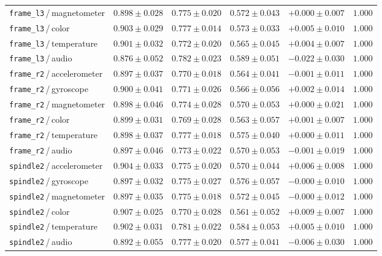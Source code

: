 \begin{table}[!htbp]
\begin{tabular}{l c c c c c}
\texttt{frame\_l3}\,/\,magnetometer & $0.898 \pm 0.028$ & $0.775 \pm 0.020$ & $0.572 \pm 0.043$ & $+0.000 \pm 0.007$ & $1.000$ \\
\texttt{frame\_l3}\,/\,color & $0.903 \pm 0.029$ & $0.777 \pm 0.014$ & $0.573 \pm 0.033$ & $+0.005 \pm 0.010$ & $1.000$ \\
\texttt{frame\_l3}\,/\,temperature & $0.901 \pm 0.032$ & $0.772 \pm 0.020$ & $0.565 \pm 0.045$ & $+0.004 \pm 0.007$ & $1.000$ \\
\texttt{frame\_l3}\,/\,audio & $0.876 \pm 0.052$ & $0.782 \pm 0.023$ & $0.589 \pm 0.051$ & $-0.022 \pm 0.030$ & $1.000$ \\
\texttt{frame\_r2}\,/\,accelerometer & $0.897 \pm 0.037$ & $0.770 \pm 0.018$ & $0.564 \pm 0.041$ & $-0.001 \pm 0.011$ & $1.000$ \\
\texttt{frame\_r2}\,/\,gyroscope & $0.900 \pm 0.041$ & $0.771 \pm 0.026$ & $0.566 \pm 0.056$ & $+0.002 \pm 0.014$ & $1.000$ \\
\texttt{frame\_r2}\,/\,magnetometer & $0.898 \pm 0.046$ & $0.774 \pm 0.028$ & $0.570 \pm 0.053$ & $+0.000 \pm 0.021$ & $1.000$ \\
\texttt{frame\_r2}\,/\,color & $0.899 \pm 0.031$ & $0.769 \pm 0.028$ & $0.563 \pm 0.057$ & $+0.001 \pm 0.007$ & $1.000$ \\
\texttt{frame\_r2}\,/\,temperature & $0.898 \pm 0.037$ & $0.777 \pm 0.018$ & $0.575 \pm 0.040$ & $+0.000 \pm 0.011$ & $1.000$ \\
\texttt{frame\_r2}\,/\,audio & $0.897 \pm 0.046$ & $0.773 \pm 0.022$ & $0.570 \pm 0.053$ & $-0.001 \pm 0.019$ & $1.000$ \\
\texttt{spindle2}\,/\,accelerometer & $0.904 \pm 0.033$ & $0.775 \pm 0.020$ & $0.570 \pm 0.044$ & $+0.006 \pm 0.008$ & $1.000$ \\
\texttt{spindle2}\,/\,gyroscope & $0.897 \pm 0.032$ & $0.775 \pm 0.027$ & $0.576 \pm 0.057$ & $-0.000 \pm 0.010$ & $1.000$ \\
\texttt{spindle2}\,/\,magnetometer & $0.897 \pm 0.035$ & $0.775 \pm 0.018$ & $0.572 \pm 0.045$ & $-0.000 \pm 0.012$ & $1.000$ \\
\texttt{spindle2}\,/\,color & $0.907 \pm 0.025$ & $0.770 \pm 0.028$ & $0.561 \pm 0.052$ & $+0.009 \pm 0.007$ & $1.000$ \\
\texttt{spindle2}\,/\,temperature & $0.902 \pm 0.031$ & $0.781 \pm 0.022$ & $0.584 \pm 0.053$ & $+0.005 \pm 0.010$ & $1.000$ \\
\texttt{spindle2}\,/\,audio & $0.892 \pm 0.055$ & $0.777 \pm 0.020$ & $0.577 \pm 0.041$ & $-0.006 \pm 0.030$ & $1.000$ \\

\end{tabular}
\end{table}

